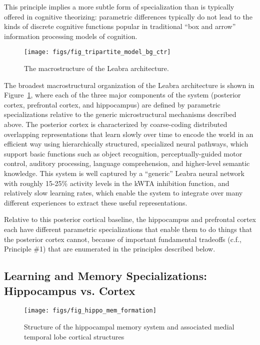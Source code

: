 \documentclass[11pt,twoside]{article}
\begin{document}
This principle implies a more subtle form of specialization than is typically offered in cognitive theorizing: parametric differences typically do not lead to the kinds of discrete cognitive functions popular in traditional ``box and arrow'' information processing models of cognition.

\begin{figure}
  \centering\texttt{[image: figs/fig\_tripartite\_model\_bg\_ctr]}
  \caption{\small The macrostructure of the Leabra architecture.}
  \label{fig.tripartite_model}
\end{figure}

The broadest macrostructural organization of the Leabra architecture is shown in Figure~\ref{fig.tripartite_model}, where each of the three major components of the system (posterior cortex, prefrontal cortex, and hippocampus) are defined by parametric specializations relative to the generic microstructural mechanisms described above.  The posterior cortex is characterized by coarse-coding distributed overlapping representations that learn slowly over time to encode the world in an efficient way using hierarchically structured, specialized neural pathways, which support basic functions such as object recognition, perceptually-guided motor control, auditory processing, language comprehension, and higher-level semantic knowledge.  This system is well captured by a ``generic'' Leabra neural network with roughly 15-25\% activity levels in the kWTA inhibition function, and relatively slow learning rates, which enable the system to integrate over many different experiences to extract these useful representations.  

Relative to this posterior cortical baseline, the hippocampus and prefrontal cortex each have different parametric specializations that enable them to do things that the posterior cortex cannot, because of important fundamental tradeoffs (c.f., Principle \#1) that are enumerated in the principles described below.

\subsection{Learning and Memory Specializations: Hippocampus vs. Cortex}

\begin{figure}
  \centering\texttt{[image: figs/fig\_hippo\_mem\_formation]}
  \caption{\small Structure of the hippocampal memory system and associated medial temporal lobe cortical structures}
  \label{fig.hippo}
\end{figure}
\end{document}
